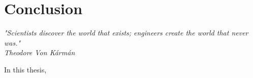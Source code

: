 \chapter{Conclusion}
\label{sec:Conclusion}

{
\begin{flushright}
\small
\textit{"Scientists discover the world that exists; engineers create the world that never was."} \\ 
\emph{Theodore Von Kármán}
\end{flushright}
}
\vspace{+10pt}






In this thesis,

